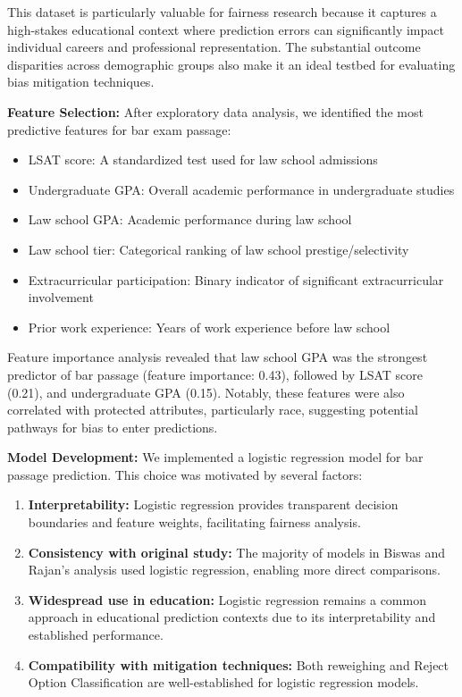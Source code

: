 \documentclass[10pt,journal,compsoc]{IEEEtran}
\begin{document}
This dataset is particularly valuable for fairness research because it captures a high-stakes educational context where prediction errors can significantly impact individual careers and professional representation. The substantial outcome disparities across demographic groups also make it an ideal testbed for evaluating bias mitigation techniques.

\textbf{Feature Selection:} After exploratory data analysis, we identified the most predictive features for bar exam passage:
\begin{itemize}
\item LSAT score: A standardized test used for law school admissions
\item Undergraduate GPA: Overall academic performance in undergraduate studies
\item Law school GPA: Academic performance during law school
\item Law school tier: Categorical ranking of law school prestige/selectivity
\item Extracurricular participation: Binary indicator of significant extracurricular involvement
\item Prior work experience: Years of work experience before law school
\end{itemize}

Feature importance analysis revealed that law school GPA was the strongest predictor of bar passage (feature importance: 0.43), followed by LSAT score (0.21), and undergraduate GPA (0.15). Notably, these features were also correlated with protected attributes, particularly race, suggesting potential pathways for bias to enter predictions.

\textbf{Model Development:} We implemented a logistic regression model for bar passage prediction. This choice was motivated by several factors:
\begin{enumerate}
\item \textbf{Interpretability:} Logistic regression provides transparent decision boundaries and feature weights, facilitating fairness analysis.
\item \textbf{Consistency with original study:} The majority of models in Biswas and Rajan's analysis used logistic regression, enabling more direct comparisons.
\item \textbf{Widespread use in education:} Logistic regression remains a common approach in educational prediction contexts due to its interpretability and established performance.
\item \textbf{Compatibility with mitigation techniques:} Both reweighing and Reject Option Classification are well-established for logistic regression models.
\end{enumerate}
\end{document}

